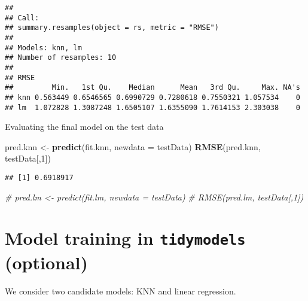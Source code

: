 \documentclass[
]{article}
\newenvironment{Shaded}{\begin{snugshade}}{\end{snugshade}}
\newcommand{\AttributeTok}[1]{\textcolor[rgb]{0.13,0.29,0.53}{#1}}
\newcommand{\CommentTok}[1]{\textcolor[rgb]{0.56,0.35,0.01}{\textit{#1}}}
\newcommand{\DecValTok}[1]{\textcolor[rgb]{0.00,0.00,0.81}{#1}}
\newcommand{\FunctionTok}[1]{\textcolor[rgb]{0.13,0.29,0.53}{\textbf{#1}}}
\newcommand{\NormalTok}[1]{#1}
\newcommand{\OtherTok}[1]{\textcolor[rgb]{0.56,0.35,0.01}{#1}}
\begin{document}
\begin{verbatim}
## 
## Call:
## summary.resamples(object = rs, metric = "RMSE")
## 
## Models: knn, lm 
## Number of resamples: 10 
## 
## RMSE 
##         Min.   1st Qu.    Median      Mean   3rd Qu.     Max. NA's
## knn 0.563449 0.6546565 0.6990729 0.7280618 0.7550321 1.057534    0
## lm  1.072828 1.3087248 1.6505107 1.6355090 1.7614153 2.303038    0
\end{verbatim}

Evaluating the final model on the test data

\begin{Shaded}
\begin{Highlighting}[]
\NormalTok{pred.knn }\OtherTok{\textless{}{-}} \FunctionTok{predict}\NormalTok{(fit.knn, }\AttributeTok{newdata =}\NormalTok{ testData)}
\FunctionTok{RMSE}\NormalTok{(pred.knn, testData[,}\DecValTok{1}\NormalTok{])}
\end{Highlighting}
\end{Shaded}

\begin{verbatim}
## [1] 0.6918917
\end{verbatim}

\begin{Shaded}
\begin{Highlighting}[]
\CommentTok{\# pred.lm \textless{}{-} predict(fit.lm, newdata = testData)}
\CommentTok{\# RMSE(pred.lm, testData[,1])}
\end{Highlighting}
\end{Shaded}

\section{\texorpdfstring{Model training in \texttt{tidymodels}
(optional)}{Model training in tidymodels (optional)}}\label{model-training-in-tidymodels-optional}

We consider two candidate models: KNN and linear regression.
\end{document}
